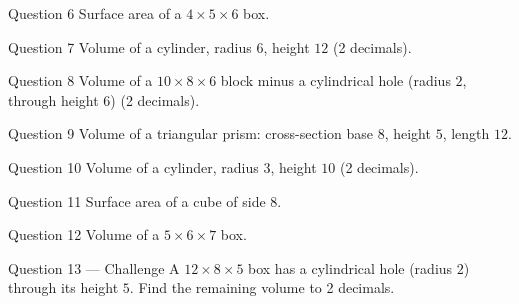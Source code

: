 \documentclass[11pt]{article}
\begin{document}
\begin{qbox}{Question 6}
Surface area of a $4\times5\times6$ box.\workspace{2.4cm}
\end{qbox}

\begin{qbox}{Question 7}
Volume of a cylinder, radius $6$, height $12$ (2 decimals).\workspace{2.4cm}
\end{qbox}

\begin{qbox}{Question 8}
Volume of a $10\times8\times6$ block minus a cylindrical hole (radius $2$, through height $6$) (2 decimals).\workspace{2.4cm}
\end{qbox}

\begin{qbox}{Question 9}
Volume of a triangular prism: cross-section base $8$, height $5$, length $12$.\workspace{2.4cm}
\end{qbox}

\begin{qbox}{Question 10}
Volume of a cylinder, radius $3$, height $10$ (2 decimals).\workspace{2.4cm}
\end{qbox}

\begin{qbox}{Question 11}
Surface area of a cube of side $8$.\workspace{2.4cm}
\end{qbox}

\begin{qbox}{Question 12}
Volume of a $5\times6\times7$ box.\workspace{2.4cm}
\end{qbox}

\begin{qbox}{Question 13 --- Challenge}
A $12\times8\times5$ box has a cylindrical hole (radius $2$) through its height $5$. Find the remaining volume to 2 decimals.\workspace{3.2cm}
\end{qbox}

\clearpage
{}
\end{document}
